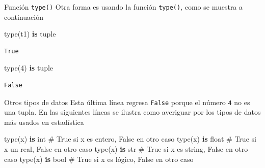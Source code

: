 \documentclass[
  ignorenonframetext,
  aspectratio=169,
  spanish,
]{beamer}
\newenvironment{Shaded}{\begin{snugshade}}{\end{snugshade}}
\newcommand{\BuiltInTok}[1]{\textcolor[rgb]{0.00,0.23,0.31}{#1}}
\newcommand{\CommentTok}[1]{\textcolor[rgb]{0.37,0.37,0.37}{#1}}
\newcommand{\DecValTok}[1]{\textcolor[rgb]{0.68,0.00,0.00}{#1}}
\newcommand{\KeywordTok}[1]{\textcolor[rgb]{0.00,0.23,0.31}{\textbf{#1}}}
\newcommand{\NormalTok}[1]{\textcolor[rgb]{0.00,0.23,0.31}{#1}}
\begin{document}
\begin{frame}[fragile]{Función \texttt{type()}}
\label{funciuxf3n-type-1}
Otra forma es usando la función \texttt{type()}, como se muestra a
continuación

\begin{Shaded}
\begin{Highlighting}[]
\BuiltInTok{type}\NormalTok{(t1) }\KeywordTok{is} \BuiltInTok{tuple}
\end{Highlighting}
\end{Shaded}

\begin{verbatim}
True
\end{verbatim}

\begin{Shaded}
\begin{Highlighting}[]
\BuiltInTok{type}\NormalTok{(}\DecValTok{4}\NormalTok{) }\KeywordTok{is} \BuiltInTok{tuple}
\end{Highlighting}
\end{Shaded}

\begin{verbatim}
False
\end{verbatim}
\end{frame}

\begin{frame}[fragile]{Otros tipos de datos}
\label{otros-tipos-de-datos}
Esta última línea regresa \texttt{False} porque el número \texttt{4} no
es una tupla. En las siguientes líneas se ilustra como averiguar por los
tipos de datos más usados en estadística

\begin{Shaded}
\begin{Highlighting}[]
\BuiltInTok{type}\NormalTok{(x) }\KeywordTok{is} \BuiltInTok{int}    \CommentTok{\# True si x es entero, False en otro caso}
\BuiltInTok{type}\NormalTok{(x) }\KeywordTok{is} \BuiltInTok{float}  \CommentTok{\# True si x un real, False en otro caso}
\BuiltInTok{type}\NormalTok{(x) }\KeywordTok{is} \BuiltInTok{str}    \CommentTok{\# True si x es string,  False en otro caso}
\BuiltInTok{type}\NormalTok{(x) }\KeywordTok{is} \BuiltInTok{bool}   \CommentTok{\# True si x es lógico,  False en otro caso }
\end{Highlighting}
\end{Shaded}
\end{frame}
\end{document}
